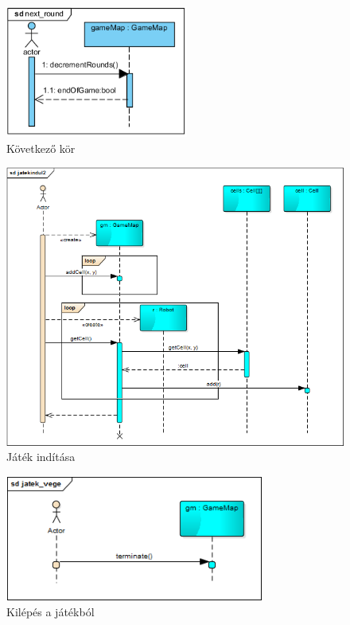\begin{figure}[!htbp]
	\begin{center}
		\includegraphics[width=6cm]{./chapters/chapter05/nextround.png}
		\caption{Következő kör}
	\end{center}
\end{figure}


\begin{figure}[!htbp]
	\begin{center}
		\includegraphics[width=14cm]{./chapters/chapter05/gamestart.png}
		\caption{Játék indítása}
	\end{center}
\end{figure}

\begin{figure}[!htbp]
	\begin{center}
		\includegraphics[width=8.5cm]{./chapters/chapter05/game_end.png}
		\caption{Kilépés a játékból}
	\end{center}
\end{figure}


